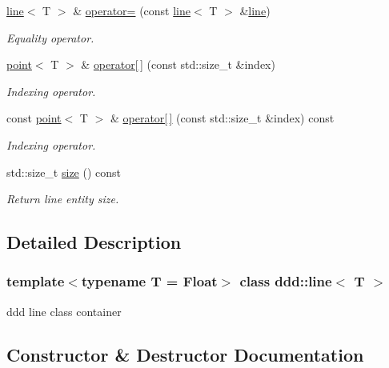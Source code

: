 \begin{DoxyCompactItemize}
\hyperlink{classddd_1_1line}{line}$<$ T $>$ \& \hyperlink{classddd_1_1line_a22cb20bea375f801ada57f910f6d66e2}{operator=} (const \hyperlink{classddd_1_1line}{line}$<$ T $>$ \&\hyperlink{classddd_1_1line}{line})
\begin{DoxyCompactList}\small\item\em Equality operator. \end{DoxyCompactList}\item 
\hyperlink{classddd_1_1point}{point}$<$ T $>$ \& \hyperlink{classddd_1_1line_a04a2abe2c302b5ca97074116b2c39499}{operator\mbox{[}$\,$\mbox{]}} (const std\+::size\+\_\+t \&index)
\begin{DoxyCompactList}\small\item\em Indexing operator. \end{DoxyCompactList}\item 
const \hyperlink{classddd_1_1point}{point}$<$ T $>$ \& \hyperlink{classddd_1_1line_af12bf431234fac2996ca667ee4f70f3a}{operator\mbox{[}$\,$\mbox{]}} (const std\+::size\+\_\+t \&index) const
\begin{DoxyCompactList}\small\item\em Indexing operator. \end{DoxyCompactList}\item 
\mbox{\label{classddd_1_1line_a0ea347ed20be8fdfe15f960008e3e475}} 
std\+::size\+\_\+t \hyperlink{classddd_1_1line_a0ea347ed20be8fdfe15f960008e3e475}{size} () const
\begin{DoxyCompactList}\small\item\em Return line entity size. \end{DoxyCompactList}\end{DoxyCompactItemize}


\subsection{Detailed Description}
\subsubsection*{template$<$typename T = Float$>$\newline
class ddd\+::line$<$ T $>$}

ddd line class container 

\subsection{Constructor \& Destructor Documentation}
\mbox{\label{classddd_1_1line_a1b5a2bea42f89d3d77bde14f49f072d9}} 
